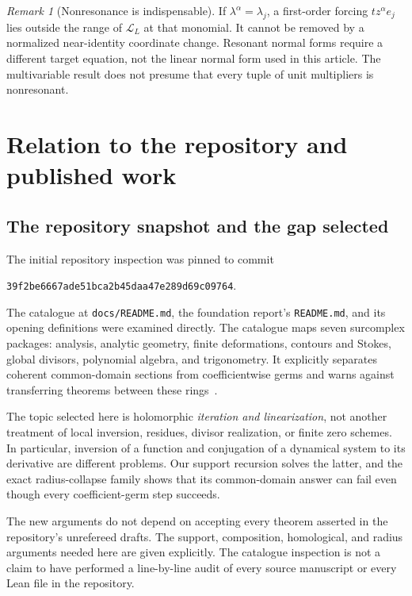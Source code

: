 \documentclass[11pt,a4paper]{article}
\numberwithin{equation}{section}
\theoremstyle{definition}
\theoremstyle{remark}
\newtheorem{remark}[theorem]{Remark}
\newcommand{\LL}{\mathcal L}
\begin{document}
\begin{remark}[Nonresonance is indispensable]
If $\lambda^\alpha=\lambda_j$, a first-order forcing
$t z^\alpha e_j$ lies outside the range of $\LL_L$ at that monomial.
It cannot be removed by a normalized near-identity coordinate change.
Resonant normal forms require a different target equation, not the
linear normal form used in this article. The multivariable result does
not presume that every tuple of unit multipliers is nonresonant.
\end{remark}

\section{Relation to the repository and published work}\label{sec:context}

\subsection{The repository snapshot and the gap selected}

The initial repository inspection was pinned to commit
\begin{center}
\small\texttt{39f2be6667ade51bca2b45daa47e289d69c09764}.
\end{center}
The catalogue at \texttt{docs/README.md}, the foundation report's
\texttt{README.md}, and its opening definitions were examined directly.
The catalogue maps seven surcomplex packages: analysis, analytic geometry,
finite deformations, contours and Stokes, global divisors, polynomial
algebra, and trigonometry. It explicitly separates coherent common-domain
sections from coefficientwise germs and warns against transferring theorems
between these rings~\cite{Repo}.

The topic selected here is holomorphic \emph{iteration and linearization},
not another treatment of local inversion, residues, divisor realization,
or finite zero schemes. In particular, inversion of a function and
conjugation of a dynamical system to its derivative are different problems.
Our support recursion solves the latter, and the exact radius-collapse
family shows that its common-domain answer can fail even though every
coefficient-germ step succeeds.

The new arguments do not depend on accepting every theorem asserted in
the repository's unrefereed drafts. The support, composition, homological,
and radius arguments needed here are given explicitly. The catalogue
inspection is not a claim to have performed a line-by-line audit of every
source manuscript or every Lean file in the repository.
\end{document}
